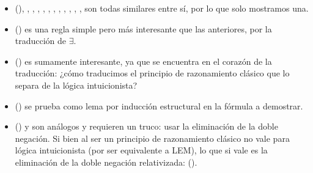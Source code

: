 \begin{itemize}
    \item {} (), , , , ,
          , , , , , , ,  son todas similares entre sí, por lo que solo mostramos una.
    \item {} () es una regla simple pero más interesante que las anteriores, por la traducción de $\exists$.
    \item {} () es sumamente interesante, ya que se encuentra en el corazón de la traducción: ¿cómo traducimos el principio de razonamiento clásico que lo separa de la lógica intuicionista?
    \item {} ()  se prueba como lema por inducción estructural en la fórmula a demostrar.
    \item {} () y  son análogos y requieren un truco: usar la eliminación de la doble negación. Si bien al ser un principio de razonamiento clásico no vale para lógica intuicionista (por ser equivalente a LEM), lo que si vale es la eliminación de la doble negación relativizada:  ().
\end{itemize}

